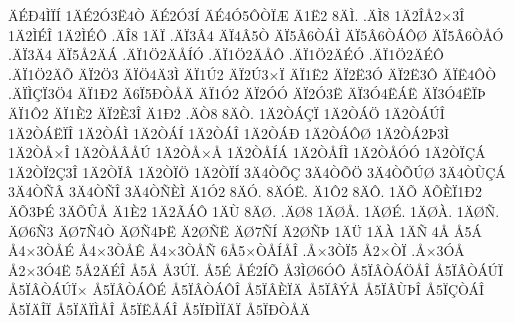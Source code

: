 {^^c4^^c9^^d04^^cc^^cf^^cd
1^^c4^^c92^^d33^^cb4^^d2
^^c4^^c92^^d33^^cd
^^c4^^c94^^d35^^d4^^d2^^cf^^c6
^^c41^^cb2
8^^c4^^cc.
.^^c4^^cc8
1^^c42^^ce^^c52^^d73^^ce
1^^c42^^cc^^c9^^ce
1^^c42^^cc^^c9^^d4
.^^c4^^ce8
1^^c4^^cf
.^^c4^^cf3^^c24
^^c4^^cf4^^c25^^d2
^^c4^^cf5^^c26^^d2^^c1^^cc
^^c4^^cf5^^c26^^d2^^c1^^d4^^d8
^^c4^^cf5^^c26^^d2^^c5^^d3
.^^c4^^cf3^^c44
^^c4^^cf5^^c52^^c4^^c1
.^^c4^^cf1^^d62^^c4^^c5^^cd^^d3
.^^c4^^cf1^^d62^^c4^^c5^^d4
.^^c4^^cf1^^d62^^c4^^c9^^d3
.^^c4^^cf1^^d62^^c4^^c9^^d4
.^^c4^^cf1^^d62^^c4^^d5
^^c4^^cf2^^d63
^^c4^^cf^^d64^^c43^^cc
^^c4^^cf1^^da2
^^c4^^cf2^^da3^^d7^^cf
^^c4^^cf1^^cb2
^^c4^^cf2^^cb3^^d3
^^c4^^cf2^^cb3^^d4
^^c4^^cf^^cb4^^d4^^d2
.^^c4^^cf^^cc^^c7^^cf3^^d64
^^c4^^cf1^^d02
^^c46^^cf5^^d0^^d2^^c5^^c4
^^c4^^cf1^^d32
^^c4^^cf2^^d3^^d3
^^c4^^cf2^^d33^^cb
^^c4^^cf3^^d34^^cb^^c1^^cb
^^c4^^cf3^^d34^^cb^^cf^^de
^^c4^^cf1^^d42
^^c4^^cf1^^c82
^^c4^^cf2^^c83^^ce
^^c41^^d02
.^^c4^^d28
8^^c4^^d2.
1^^c42^^d2^^c1^^c7^^cf
1^^c42^^d2^^c1^^d6
1^^c42^^d2^^c1^^da^^ce
1^^c42^^d2^^c1^^cb^^cf^^ce
1^^c42^^d2^^c1^^cc
1^^c42^^d2^^c1^^cd
1^^c42^^d2^^c1^^ce
1^^c42^^d2^^c1^^d0
1^^c42^^d2^^c1^^d4^^d8
1^^c42^^d2^^c12^^de3^^cc
1^^c42^^d2^^c5^^d7^^ce
1^^c42^^d2^^c5^^c2^^c5^^da
1^^c42^^d2^^c5^^d7^^c5
1^^c42^^d2^^c5^^cd^^c1
1^^c42^^d2^^c5^^cd^^cc
1^^c42^^d2^^c5^^d3^^d3
1^^c42^^d2^^cf^^c7^^c1
1^^c42^^d2^^cf2^^c73^^ce
1^^c42^^d2^^cf^^c2
1^^c42^^d2^^cf^^d6
1^^c42^^d2^^cf^^cd
3^^c44^^d2^^d5^^c7
3^^c44^^d2^^d5^^d6
3^^c44^^d2^^d5^^da^^d8
3^^c44^^d2^^d9^^c7^^c1
3^^c44^^d2^^d1^^c2
3^^c44^^d2^^d1^^ce
3^^c44^^d2^^d1^^c8^^cc
^^c41^^d32
8^^c4^^d3.
8^^c4^^d3^^cb.
^^c41^^d42
8^^c4^^d4.
1^^c4^^d5
^^c4^^d5^^c8^^cf1^^d02
^^c4^^d53^^de^^c9
3^^c4^^d5^^db^^c5
^^c41^^c82
1^^c42^^c3^^c1^^d4
1^^c4^^d9
8^^c4^^d8.
.^^c4^^d88
1^^c4^^d8^^c5.
1^^c4^^d8^^c9.
1^^c4^^d8^^c0.
1^^c4^^d8^^d1.
^^c4^^d86^^d13
^^c4^^d87^^d14^^d2
^^c4^^d8^^d14^^de^^cb
^^c42^^d8^^d1^^cb
^^c4^^d87^^d1^^cd
^^c42^^d8^^d1^^de
1^^c4^^dc
1^^c4^^c0
1^^c4^^d1
4^^c5
^^c55^^c1
^^c54^^d73^^d2^^c5^^c9
^^c54^^d73^^d2^^c5^^ca
^^c54^^d73^^d2^^c5^^d1
6^^c55^^d7^^d2^^c5^^cd^^c5^^ce
.^^c5^^d73^^d2^^cf5
^^c52^^d7^^d2^^cf
.^^c5^^d73^^d3^^c5
^^c52^^d73^^d34^^cb
5^^c52^^c4^^c9^^ce
^^c55^^c5
^^c53^^da^^cf.
^^c55^^c9
^^c5^^c92^^cd^^d5
^^c53^^cc^^d86^^d3^^d4
^^c55^^cf^^c2^^d2^^c1^^d6^^c5^^ce
^^c55^^cf^^c2^^d2^^c1^^da^^cf
^^c55^^cf^^c2^^d2^^c1^^da^^cf^^d7
^^c55^^cf^^c2^^d2^^c1^^d4^^c9
^^c55^^cf^^c2^^d2^^c1^^d4^^ce
^^c55^^cf^^c2^^c8^^cf^^c4
^^c55^^cf^^c2^^dd^^c5
^^c55^^cf^^c2^^d9^^de^^ce
^^c55^^cf^^c7^^d2^^c1^^ce
^^c55^^cf^^c4^^ce^^cf
^^c55^^cf^^c4^^cf^^cc^^c5^^ce
^^c55^^cf^^cb^^c5^^c1^^ce
^^c55^^cf^^d0^^cc^^cf^^c4^^cf
^^c55^^cf^^d0^^d2^^c5^^c4
}
